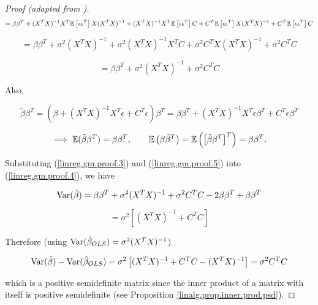\begin{proof}[Proof (adapted from \citet{pesaran-2015-text})]
\[
=   \beta \beta^T   + (X^TX)^{-1} X^T \E \left[ \epsilon\epsilon^T \right] X  (X^TX)^{-1}  +  (X^TX)^{-1} X^T \E \left[ \epsilon \epsilon^T \right] C  +  C^T \E \left[ \epsilon \epsilon^T \right] X  (X^TX)^{-1}    + C^T \E \left[\epsilon\epsilon^T  \right] C  
\]

\[
=  \beta \beta^T   + \sigma^2 (X^TX)^{-1}   + \sigma^2  (X^TX)^{-1} X^T C  +   \sigma^2 C^T X  (X^TX)^{-1}    +  \sigma^2 C^T C 
\]


\begin{equation}\label{linreg.gm.proof.3}
 =  \beta \beta^T   + \sigma^2 (X^TX)^{-1}        +  \sigma^2 C^T C 
\end{equation}

Also,

\[
\tilde{\beta} \beta^T = ( \beta + (X^TX)^{-1} X^T \epsilon  + C^T\epsilon)\beta^T = \beta \beta^T + (X^TX)^{-1} X^T \epsilon \beta^T + C^T \epsilon \beta^T
\]

\begin{equation}\label{linreg.gm.proof.5}
\implies \E(\tilde{\beta} \beta^T) = \beta \beta^T , \qquad \E \left( \beta \tilde{\beta}^T \right) = \E \left( \left[ \tilde{\beta} \beta^T \right]^T \right) = \beta \beta^T.
\end{equation}

Substituting (\ref{linreg.gm.proof.3}) and (\ref{linreg.gm.proof.5}) into (\ref{linreg.gm.proof.4}), we have

\[
\Var(\tilde{\beta}) =  \beta \beta^T   + \sigma^2 (X^TX)^{-1}     +  \sigma^2 C^T C   - 2 \beta \beta^T + \beta \beta^T 
\]

\[
=   \sigma^2 \left[ (X^TX)^{-1}  +   C^T C   \right]
\]

Therefore (using \( \Var (\hat{\beta}_{OLS})  = \sigma^2 (X^TX)^{-1} \))

\[
\Var(\tilde{\beta})  - \Var (\hat{\beta}_{OLS}) = \sigma^2 \left[ (X^TX)^{-1}    +   C^T C - (X^TX)^{-1}  \right] 
= \sigma^2    C^T C    
\]

which is a positive semidefinite matrix since the inner product of a matrix with itself is positive semidefinite (see Proposition \ref{linalg.prop.inner.prod.psd}).

%

\end{proof}

